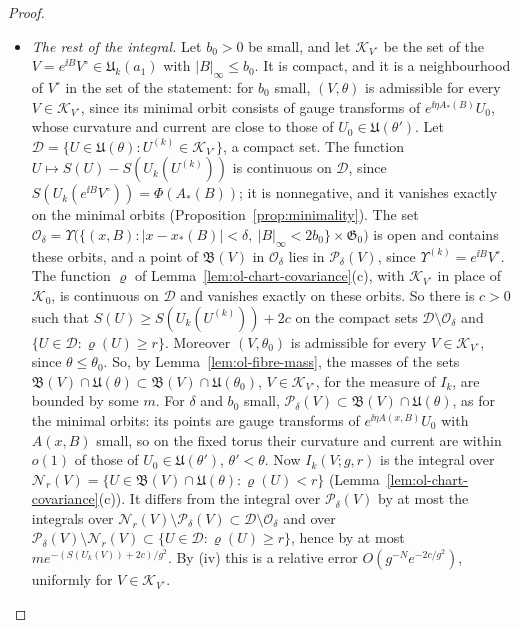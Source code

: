 \begin{proof}
\begin{itemize}
\[
(2\pi g^2)^{N/2}e^{-S(U_k(V))/g^2}\det H(B)^{-1/2}\varsigma(x_*(B),B)\big(1+o(1)\big),
\]
uniformly for $V$ near $V^\circ$.
\item[(v)] \emph{The rest of the integral.} Let $b_0>0$ be small, and let $\mathcal K_{V^\circ}$ be the set of the $V=e^{\ii B}V^\circ\in\mathfrak U_k(a_1)$ with $|B|_\infty\le b_0$. It is compact, and it is a neighbourhood of $V^\circ$ in the set of the statement: for $b_0$ small, $(V,\theta)$ is admissible for every $V\in\mathcal K_{V^\circ}$, since its minimal orbit consists of gauge transforms of $e^{\ii\eta A_*(B)}U_0$, whose curvature and current are close to those of $U_0\in\mathfrak U(\theta')$. Let $\mathcal D=\{U\in\mathfrak U(\theta):U^{(k)}\in\mathcal K_{V^\circ}\}$, a compact set. The function $U\mapsto S(U)-S(U_k(U^{(k)}))$ is continuous on $\mathcal D$, since $S(U_k(e^{\ii B}V^\circ))=\Phi(A_*(B))$; it is nonnegative, and it vanishes exactly on the minimal orbits (Proposition~\ref{prop:minimality}). The set $\mathcal O_\delta=\Upsilon\big(\{(x,B):|x-x_*(B)|<\delta,\ |B|_\infty<2b_0\}\times\mathfrak G_0\big)$ is open and contains these orbits, and a point of $\mathfrak B(V)$ in $\mathcal O_\delta$ lies in $\mathcal P_\delta(V)$, since $\Upsilon^{(k)}=e^{\ii B}V^\circ$. The function $\varrho$ of Lemma~\ref{lem:ol-chart-covariance}(c), with $\mathcal K_{V^\circ}$ in place of $\mathcal K_0$, is continuous on $\mathcal D$ and vanishes exactly on these orbits. So there is $c>0$ such that $S(U)\ge S(U_k(U^{(k)}))+2c$ on the compact sets $\mathcal D\setminus\mathcal O_\delta$ and $\{U\in\mathcal D:\varrho(U)\ge r\}$. Moreover $(V,\theta_0)$ is admissible for every $V\in\mathcal K_{V^\circ}$, since $\theta\le\theta_0$. So, by Lemma~\ref{lem:ol-fibre-mass}, the masses of the sets $\mathfrak B(V)\cap\mathfrak U(\theta)\subset\mathfrak B(V)\cap\mathfrak U(\theta_0)$, $V\in\mathcal K_{V^\circ}$, for the measure of $I_k$, are bounded by some $m$. For $\delta$ and $b_0$ small, $\mathcal P_\delta(V)\subset\mathfrak B(V)\cap\mathfrak U(\theta)$, as for the minimal orbits: its points are gauge transforms of $e^{\ii\eta A(x,B)}U_0$ with $A(x,B)$ small, so on the fixed torus their curvature and current are within $o(1)$ of those of $U_0\in\mathfrak U(\theta')$, $\theta'<\theta$. Now $I_k(V;g,r)$ is the integral over $\mathscr N_r(V)=\{U\in\mathfrak B(V)\cap\mathfrak U(\theta):\varrho(U)<r\}$ (Lemma~\ref{lem:ol-chart-covariance}(c)). It differs from the integral over $\mathcal P_\delta(V)$ by at most the integrals over $\mathscr N_r(V)\setminus\mathcal P_\delta(V)\subset\mathcal D\setminus\mathcal O_\delta$ and over $\mathcal P_\delta(V)\setminus\mathscr N_r(V)\subset\{U\in\mathcal D:\varrho(U)\ge r\}$, hence by at most $me^{-(S(U_k(V))+2c)/g^2}$. By (iv) this is a relative error $O(g^{-N}e^{-2c/g^2})$, uniformly for $V\in\mathcal K_{V^\circ}$.

\end{itemize}
\end{proof}
